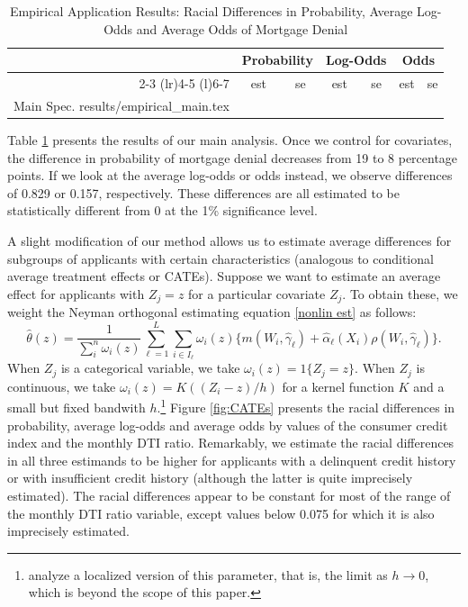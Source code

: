 \documentclass[aos]{imsart}
\makeatletter
\numberwithin{equation}{section}
\theoremstyle{plain}
\theoremstyle{remark}
\newcommand\tableinput[1]{\@@input #1 }
\makeatother
\begin{document}
\begin{table}[!h] \centering
    \caption{Empirical Application Results: Racial Differences in Probability, Average Log-Odds and Average Odds of Mortgage Denial}
    \label{tab:empirical}
    \begin{tabular}{rcccccc}
    \toprule
    & \multicolumn{2}{c}{Probability} & \multicolumn{2}{c}{Log-Odds} & \multicolumn{2}{c}{Odds} \\
    \cmidrule(r){2-3} \cmidrule(lr){4-5} \cmidrule(l){6-7}
    & est & se & est & se & est & se \\
    \midrule
    Main Spec. \tableinput{results/empirical_main.tex}
    \bottomrule
    \end{tabular}
\end{table}

Table \ref{tab:empirical} presents the results of our main analysis. Once we control for covariates, the difference in probability of mortgage denial decreases from 19 to 8 percentage points. If we look at the average log-odds or odds instead, we observe differences of 0.829 or 0.157, respectively. These differences are all estimated to be statistically different from 0 at the 1\% significance level.

A slight modification of our method allows us to estimate average differences for subgroups of applicants with certain characteristics (analogous to conditional average treatment effects or CATEs). Suppose we want to estimate an average effect for applicants with $Z_j = z$ for a particular covariate $Z_j$. To obtain these, we weight the Neyman orthogonal estimating equation \eqref{nonlin est} as follows:
\[\hat{\theta}(z) = \frac{1}{\sum_{i}^n \omega_i(z)}\sum_{\ell=1}^{L}\sum_{i\in I_{\ell}}%
\omega_i(z) \{m(W_
{i},\hat{\gamma}_{\ell})+\hat{\alpha}_{\ell}(X_{i}%
)\rho(W_{i},\hat{\gamma}_{\ell})\}.\]
When $Z_j$ is a categorical variable, we take $\omega_i(z) = 1\{Z_j = z\}$. When $Z_j$ is continuous, we take $\omega_i(z) = K((Z_i - z)/h)$ for a kernel function $K$ and a small but fixed bandwith $h$.\footnote{\cite{chernozhukov2019global} analyze a localized version of this parameter, that is, the limit as $h \to 0$, which is beyond the scope of this paper.} Figure \ref{fig:CATEs} presents the racial differences in probability, average log-odds and average odds by values of the consumer credit index and the monthly DTI ratio. Remarkably, we estimate the racial differences in all three estimands to be higher for applicants with a delinquent credit history or with insufficient credit history (although the latter is quite imprecisely estimated). The racial differences appear to be constant for most of the range of the monthly DTI ratio variable, except values below 0.075 for which it is also imprecisely estimated.
\end{document}
